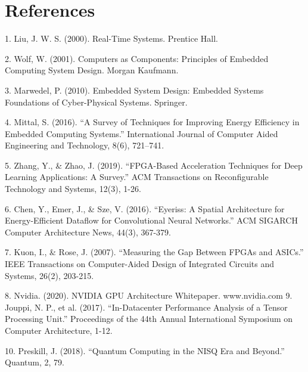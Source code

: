 \documentclass{article}
\begin{document}
\newpage
\section{References}

	1.	Liu, J. W. S. (2000). Real-Time Systems. Prentice Hall.
    
	2.	Wolf, W. (2001). Computers as Components: Principles of Embedded Computing System Design. Morgan Kaufmann.
    
	3.	Marwedel, P. (2010). Embedded System Design: Embedded Systems Foundations of Cyber-Physical Systems. Springer.
    
	4.	Mittal, S. (2016). “A Survey of Techniques for Improving Energy Efficiency in Embedded Computing Systems.” International Journal of Computer Aided Engineering and Technology, 8(6), 721–741.
    
	5.	Zhang, Y., & Zhao, J. (2019). “FPGA-Based Acceleration Techniques for Deep Learning Applications: A Survey.” ACM Transactions on Reconfigurable Technology and Systems, 12(3), 1-26.
    
	6.	Chen, Y., Emer, J., & Sze, V. (2016). “Eyeriss: A Spatial Architecture for Energy-Efficient Dataflow for Convolutional Neural Networks.” ACM SIGARCH Computer Architecture News, 44(3), 367-379.
    
	7.	Kuon, I., & Rose, J. (2007). “Measuring the Gap Between FPGAs and ASICs.” IEEE Transactions on Computer-Aided Design of Integrated Circuits and Systems, 26(2), 203-215.
    
	8.	Nvidia. (2020). NVIDIA GPU Architecture Whitepaper. www.nvidia.com
	9.	Jouppi, N. P., et al. (2017). “In-Datacenter Performance Analysis of a Tensor Processing Unit.” Proceedings of the 44th Annual International Symposium on Computer Architecture, 1-12.
    
	10.	Preskill, J. (2018). “Quantum Computing in the NISQ Era and Beyond.” Quantum, 2, 79.
\end{document}
